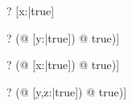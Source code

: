 \documentclass{article}
\begin{document}
\begin{zed}
\vdash? [x:\arithmos|true] 
\end{zed}

\begin{zed}
\vdash? ( @ [y:\arithmos|true]) \unfoldsTo
        [y:\arithmos | (\exists [x:\arithmos|true] @ true)]
\end{zed}

\begin{zed}
\vdash? ( @ [x:\arithmos|true]) \unfoldsTo
        [ | (\exists [x:\arithmos|true] @ true)]
\end{zed}

\begin{zed}
\vdash? ( @ [y,z:\arithmos|true]) \unfoldsTo
        [y:\arithmos | (\exists [x:\arithmos~; z:\arithmos|true] @ true)]
\end{zed}
\end{document}
